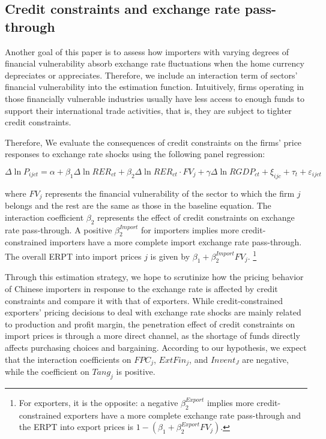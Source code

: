 \documentclass[12pt]{article}
\begin{document}
\subsection{Credit constraints and exchange rate pass-through}

Another goal of this paper is to assess how importers with varying degrees of financial vulnerability absorb exchange rate fluctuations when the home currency depreciates or appreciates. Therefore, we include an interaction term of sectors’ financial vulnerability into the estimation function. Intuitively, firms operating in those financially vulnerable industries usually have less access to enough funds to support their international trade activities, that is, they are subject to tighter credit constraints.

Therefore, We evaluate the consequences of credit constraints on the firms' price responses to exchange rate shocks using the following panel regression:

\begin{equation}
	\Delta \ln P_{ijct}=\alpha+\beta_{1} \Delta \ln RER_{ct}+\beta_{2} \Delta \ln RER_{ct} \cdot FV_{j}+\gamma \Delta \ln RGDP_{ct}+\xi_{ijc}+\tau_{t} +\varepsilon_{ijct}
	\label{eq.credit}
\end{equation}

where $FV_{j}$ represents the financial vulnerability of the sector to which the firm $j$ belongs and the rest are the same as those in the baseline equation. The interaction coefficient $\beta_2$ represents the effect of credit constraints on exchange rate pass-through. A positive $\beta^{Import}_2$ for importers implies more credit-constrained importers have a more complete import exchange rate pass-through. The overall ERPT into import prices $j$ is given by $\beta_{1} +\beta^{Import}_{2} FV_j$. \footnote{For exporters, it is the opposite: a negative $\beta^{Export}_2$ implies more credit-constrained exporters have a more complete exchange rate pass-through and the ERPT into export prices is $1-(\beta_{1} +\beta^{Export}_{2} FV_j)$.}

Through this estimation strategy, we hope to scrutinize how the pricing behavior of Chinese importers in response to the exchange rate is affected by credit constraints and compare it with that of exporters. While credit-constrained exporters’ pricing decisions to deal with exchange rate shocks are mainly related to production and profit margin, the penetration effect of credit constraints on import prices is through a more direct channel, as the shortage of funds directly affects purchasing choices and bargaining. According to our hypothesis, we expect that the interaction coefficients on $FPC_{j}$, $ExtFin_j$, and $Invent_J$ are negative, while the coefficient on $Tang_j$ is positive.
\end{document}
